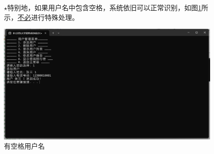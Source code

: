 \documentclass[12pt,twoside]{ctexart}
\begin{document}
\begin{figure}[H]
    \begin{minipage}[c]{0.5\textwidth}
        $\star$特别地，如果用户名中包含空格，系统依旧可以正常识别，如图\ref{fig:Spaceuser}所
        示，\underline{不必}进行特殊处理。
    \end{minipage}%
    \hfill
    \begin{minipage}[c]{0.45\textwidth}
        \centering
        \includegraphics[width=\textwidth]{spaceuser.png}
        \caption{有空格用户名}
        \label{fig:Spaceuser}
    \end{minipage}
\end{figure}
\end{document}
